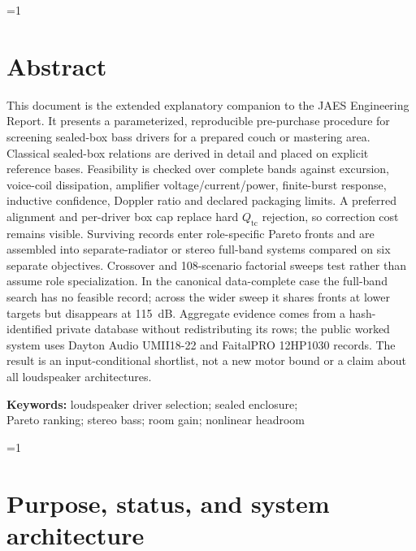 \documentclass[11pt,a4paper]{article}
\providecommand{\ELSVIERBUILD}{0}
\numberwithin{equation}{section}
\begin{document}
\ifnum\ELSVIERBUILD=1
	
\else
	
\fi

\linenumbers

\section*{Abstract}

This document is the extended explanatory companion to the JAES Engineering
Report.  It presents a parameterized, reproducible pre-purchase procedure
for screening sealed-box bass drivers for a prepared couch or mastering
area.  Classical sealed-box relations are derived in detail and placed on
explicit reference bases.  Feasibility is checked over complete bands
against excursion, voice-coil dissipation, amplifier voltage/current/power,
finite-burst response, inductive confidence, Doppler ratio and declared
packaging limits.  A preferred alignment and per-driver box cap replace
hard $Q_{\mathrm{tc}}$ rejection, so correction cost remains visible.
Surviving records enter role-specific Pareto fronts and are assembled into
separate-radiator or stereo full-band systems compared on six separate
objectives.  Crossover and 108-scenario factorial sweeps test rather than
assume role specialization.  In the canonical data-complete case the
full-band search has no feasible record; across the wider sweep it shares
fronts at lower targets but disappears at \SI{115}{dB}.  Aggregate evidence comes from a hash-identified
private database without redistributing its rows; the public worked system
uses Dayton Audio UMII18-22 and FaitalPRO 12HP1030 records.  The result is an
input-conditional shortlist, not a new motor bound or a claim about all
loudspeaker architectures.

\vspace{1em}
\noindent\textbf{Keywords:} loudspeaker driver selection; sealed enclosure;\\
Pareto ranking; stereo bass; room gain; nonlinear headroom

\ifnum\ELSVIERBUILD=1
	
\else
	
\fi

\tableofcontents
\clearpage

\section{Purpose, status, and system architecture}
\label{sec:intro}
\end{document}
